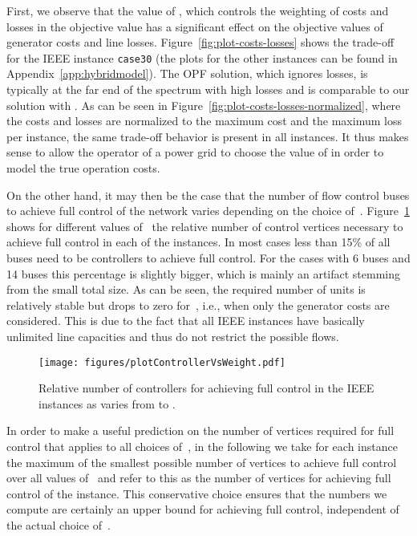 \documentclass{article}[11pt,a4paper]
\newcommand{\plotscaleOne}{0.45}
\begin{document}
 First, we observe that the value of , which controls the
 weighting of costs and losses in the objective value has a
 significant effect on the objective values of generator costs and
 line losses.  
 Figure~\ref{fig:plot-costs-losses} shows the trade-off for the IEEE
 instance \texttt{case30} (the plots for the other instances can be
 found in Appendix~\ref{app:hybridmodel}).  The OPF solution, which
 ignores losses, is typically at the far end of the spectrum with high
 losses and is comparable to our solution with .  As can
 be seen in Figure~\ref{fig:plot-costs-losses-normalized}, where the
 costs and losses are normalized to the maximum cost and the maximum
 loss per instance, the same trade-off behavior is present in all
 instances.  It thus makes sense to allow the operator of a power grid
 to choose the value of  in order to model the true operation
 costs.

On the other hand, it may then be the case that the number of flow control buses to achieve full control of the network varies depending on the
choice of~.  Figure~\ref{fig:plot-controller-weight} shows
for different values of~ the relative number of control
vertices necessary to achieve full control in each of the instances.
In most cases less than 15\% of all buses need to be controllers to
achieve full control.  For the cases with 6 buses and 14 buses this
percentage is slightly bigger, which is mainly an artifact stemming
from the small total size.  As can be seen, the required number of
units is relatively stable but drops to zero for~,
i.e., when only the generator costs are considered. This is due to the fact that all IEEE instances have basically unlimited line capacities and thus do not restrict the possible flows.

\begin{figure}[tb!]\centering
\texttt{[image: figures/plotControllerVsWeight.pdf]}
	\caption{Relative number of controllers for achieving full
          control in the IEEE instances as  varies from  to
          .}\label{fig:plot-controller-weight}\end{figure}

In order to make a useful prediction on the number of vertices
required for full control that applies to all choices of~, in
the following we take for each instance the maximum of the smallest
possible number of vertices to achieve full control over all values 
of~ and refer to this as the number of vertices for achieving
full control of the instance.  This conservative choice ensures that
the numbers we compute are certainly an upper bound for achieving full
control, independent of the actual choice of~.
\end{document}
